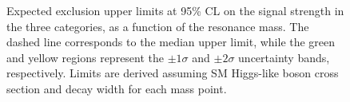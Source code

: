 \begin{figure}[!htb]
\centering
{}
\caption{Expected exclusion upper limits at 95\% CL on the signal strength in the three categories, as a function of the resonance mass. The dashed line corresponds to the median upper limit, while the green and yellow regions represent the $\pm 1\sigma$ and $\pm 2 \sigma$ uncertainty bands, respectively. Limits are derived assuming SM Higgs-like boson cross section and decay width for each mass point.}\label{fig:13TeVexplim}
\end{figure}

